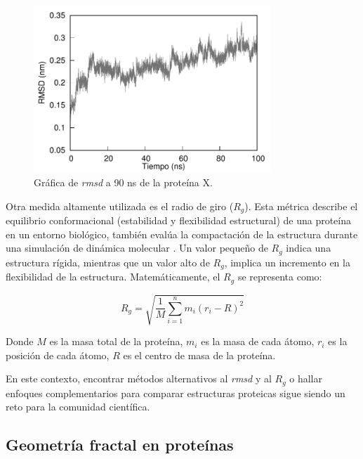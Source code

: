 	\begin{figure}[h!]
		\centering
		\includegraphics[width=0.8\textwidth]{graphs/rmsd.pdf}
	\caption{Gr\'{a}fica de \textit{rmsd} a 90 ns de la prote\'{i}na X.}
	\label{rmsd-graf}
	\end{figure}


Otra medida altamente utilizada es el radio de giro ($R_g$). Esta métrica describe el equilibrio conformacional (estabilidad y flexibilidad estructural) de una proteína en un entorno biológico, también evalúa la compactación de la estructura durante una simulación de dinámica molecular \cite{Saudagar2023}. Un valor pequeño de $R_g$ indica una estructura rígida, mientras que un valor alto de $R_g$, implica un incremento en la flexibilidad de la estructura. Matemáticamente, el $R_g$ se representa como:


\begin{equation}
	R_g = \sqrt{\frac{1}{M} \sum_{i=1}^{n} m_i \left( r_i - R \right)^2 }
	\label{rg}
\end{equation}

Donde $M$ es la masa total de la proteína, $m_i$ es la masa de cada átomo, $r_i$ es la posición de cada átomo, $R$ es el centro de masa de la proteína.

En este contexto, encontrar m\'{e}todos alternativos al \textit{rmsd} y al $R_g$ o hallar enfoques complementarios para comparar estructuras proteicas sigue siendo un reto para la comunidad cient\'{i}ﬁca.

\subsection{Geometr\'{i}a fractal en prote\'{i}nas}
\label{Gfp}

